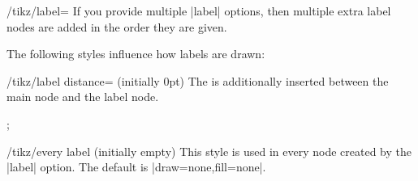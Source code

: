 \begin{key}{/tikz/label=}
  If you provide multiple |label| options, then multiple extra label
  nodes are added in the order they are given.

  The following styles influence how labels are drawn:
  \begin{key}{/tikz/label distance= (initially 0pt)}
    The  is additionally inserted between the main node
    and the label node.
\begin{codeexample}[]
\tikz[label distance=5mm]
  ;
\end{codeexample}
  \end{key}
  \begin{stylekey}{/tikz/every label (initially \normalfont empty)}
    This style is used in every node created by the |label|
    option. The default is |draw=none,fill=none|.
  \end{stylekey}
\end{key}

